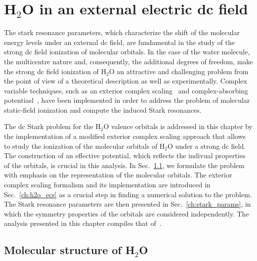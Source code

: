 \chapter{H$_{2}$O in an external electric dc field}
\label{cha:dc_h2o}


The stark resonance parameters, which characterize the shift of the
molecular energy levels under an external dc field, are fundamental in
the study of the strong dc field ionization of molecular orbitals. In
the case of the water molecule, the multicentre nature and,
consequently, the additional degrees of freedom, make the strong dc
field ionization of H$_{2}$O an attractive and challenging problem
from the point of view of a theoretical description as well as
experimentally. Complex variable techniques, such as an exterior
complex scaling~\cite{Simon_1979,Scrinzi_2010} and complex-absorbing
potentiasl~\cite{RissMeyer_1993,Krause_2014}, have been implemented in
order to address the problem of molecular static-field ionization and
compute the induced Stark resonances.

The dc Stark problem for the H$_{2}$O valence orbitals is addressed in
this chapter by the implementation of a modified exterior complex
scaling approach that allows to study the ionization of the molecular
orbitals of H$_{2}$O under a strong dc field. The construction of an
effective potential, which reflects the indivual properties of the
orbitals, is crucial in this analysis. In Sec.~\ref{ch:h2o_structure},
we formulate the problem with emphasis on the representation of the
molecular orbitals. The exterior complex scaling formalism and its
implementation are introduced in Sec.~\ref{ch:h2o_ecs} as a crucial
step in finding a numerical solution to the problem. The Stark
resonance parameters are then presented in Sec.~\ref{ch:stark_params},
in which the symmetry properties of the orbitals are considered
independently. The analysis presented in this chapter compiles that
of~\cite{sarias_2016,sarias_2017}.





\section{Molecular structure of H$_{2}$O}
\label{ch:h2o_structure}

